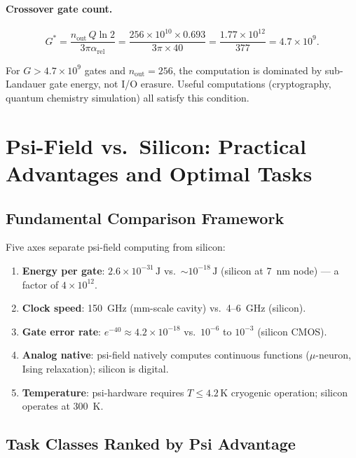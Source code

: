 \documentclass[11pt]{article}
\theoremstyle{definition}
\theoremstyle{remark}
\newcommand{\arel}{\alpha_{\mathrm{rel}}}
\begin{document}
\paragraph{Crossover gate count.}
\begin{equation}
G^* = \frac{n_{\mathrm{out}}\,Q\ln 2}{3\pi\arel}
= \frac{256\times10^{10}\times0.693}{3\pi\times40}
= \frac{1.77\times10^{12}}{377} = 4.7\times10^9.
\end{equation}

For $G > 4.7\times10^9$ gates and $n_{\mathrm{out}} = 256$, the computation
is dominated by sub-Landauer gate energy, not I/O erasure. Useful
computations (cryptography, quantum chemistry simulation) all satisfy
this condition.

\section{Psi-Field vs.\ Silicon: Practical Advantages and Optimal Tasks}
\label{sec:psi_vs_silicon}

\subsection{Fundamental Comparison Framework}

Five axes separate psi-field computing from silicon:
\begin{enumerate}[label=(\arabic*)]
\item \textbf{Energy per gate}: $2.6\times10^{-31}\,\mathrm{J}$ vs.\
  $\sim10^{-18}\,\mathrm{J}$ (silicon at 7~nm node) --- a factor of $4\times10^{12}$.
\item \textbf{Clock speed}: 150~GHz (mm-scale cavity) vs.\ 4--6~GHz (silicon).
\item \textbf{Gate error rate}: $e^{-40}\approx4.2\times10^{-18}$ vs.\ $10^{-6}$
  to $10^{-3}$ (silicon CMOS).
\item \textbf{Analog native}: psi-field natively computes continuous functions
  ($\mu$-neuron, Ising relaxation); silicon is digital.
\item \textbf{Temperature}: psi-hardware requires $T\leq4.2\,\mathrm{K}$
  cryogenic operation; silicon operates at 300~K.
\end{enumerate}

\subsection{Task Classes Ranked by Psi Advantage}
\end{document}
